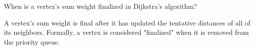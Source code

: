 When is a vertex's sum weight finalized in Dijkstra's algorithm?

\begin{answer}
A vertex's sum weight is final after it has updated the tentative distances
of all of its neighbors. Formally, a vertex is considered "finalized" when
it is removed from the priority queue.
\end{answer}
